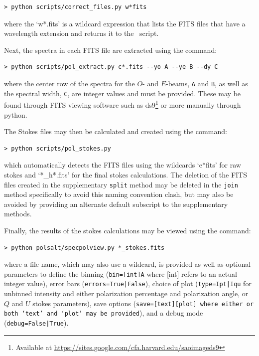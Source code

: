 \begin{verbatim}> python scripts/correct_files.py w*fits\end{verbatim}

\noindent where the `w*.fits' is a wildcard expression that lists the \gls{FITS} files that have a wavelength extension and returns it to the \polsalt\ script.
\prgph

Next, the spectra in each \gls{FITS} file are extracted using the command:

\begin{verbatim}> python scripts/pol_extract.py c*.fits --yo A --ye B --dy C\end{verbatim}

\noindent where the center row of the spectra for the $O$- and $E$-beams, \texttt{A} and \texttt{B}, as well as the spectral width, \texttt{C}, are integer values and must be provided. These may be found through \gls{FITS} viewing software such as ds9\footnote{Available at \protect\url{https://sites.google.com/cfa.harvard.edu/saoimageds9}} or more manually through python.
\prgph

The Stokes files may then be calculated and created using the command:

\begin{verbatim}> python scripts/pol_stokes.py\end{verbatim}

\noindent which automatically detects the \gls{FITS} files using the wildcards `e*fits' for raw stokes and `*\_h*.fits' for the final stokes calculations. The deletion of the \gls{FITS} files created in the supplementary \texttt{split} method may be deleted in the \texttt{join} method specifically to avoid this naming convention clash, but may also be avoided by providing an alternate default subscript to the supplementary methods.
\prgph

Finally, the results of the stokes calculations may be viewed using the command:

\begin{verbatim}> python polsalt/specpolview.py *_stokes.fits\end{verbatim}

\noindent where a file name, which may also use a wildcard, is provided as well as optional para\-meters to define the binning (\texttt{bin=[int]A} where [int] refers to an actual integer value), error bars (\texttt{errors=True|False}), choice of plot (\texttt{type=Ipt|Iqu} for unbinned intensity and either polarization percentage and polarization angle, or $Q$ and $U$ stokes parameters), save options (\texttt{save=[text][plot] where either or both `text' and `plot' may be provided}), and a debug mode (\texttt{debug=False|True}).


